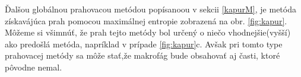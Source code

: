 \documentclass[a4paper,11pt,oneside]{article}%
\begin{document}
Ďalšou globálnou prahovacou metódou popísanoou v sekcii \ref{kapurM}, je metóda získavájúca prah pomocou maximálnej entropie zobrazená na obr. \ref{fig:kapur}. Môžeme si všimnúť, že prah tejto metódy bol určený o niečo vhodnejšie(vyšší) ako predošlá metóda, napríklad v prípade \ref{fig:kapur}c. Avšak pri tomto type prahovacej metódy sa môže stať,že makrofág bude obsahovať aj časti, ktoré pôvodne nemal.

\begin{figure}[H]  
    \hspace{5px}

\end{figure}
\end{document}

